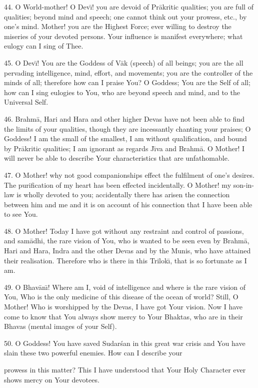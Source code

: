 44. O World-mother! O Dev\={\i}! you are devoid of Pr\=akritic qualities; you are full of qualities; beyond mind and speech; one cannot think out your prowess, etc., by one's mind. Mother! you are the Highest Force; ever willing to destroy the miseries of your devoted persons. Your influence is manifest everywhere; what eulogy can I sing of Thee.

45. O Dev\={\i}! You are the Goddess of V\=ak (speech) of all beings; you are the all pervading intelligence, mind, effort, and movements; you are the controller of the minds of all; therefore how can I praise You? O Goddess; You are the Self of all; how can I sing eulogies to You, who are beyond speech and mind, and to the Universal Self.

46. Brahm\=a, Hari and Hara and other higher Devas have not been able to find the limits of your qualities, though they are incessantly chanting your praises; O Goddess! I am the small of the smallest, I am without qualification, and bound by Pr\=akritic qualities; I am ignorant as regards J\={\i}va and Brahm\=a. O Mother! I will never be able to describe Your characteristics that are unfathomable.

47. O Mother! why not good companionships effect the fulfilment of one's desires. The purification of my heart has been effected incidentally. O Mother! my son-in-law is wholly devoted to you; accidentally there has arisen the connection between him and me and it is on account of his connection that I have been able to see You.

48. O Mother! Today I have got without any restraint and control of passions, and sam\=adhi, the rare vision of You, who is wanted to be seen even by Brahm\=a, Hari and Hara, Indra and the other Devas and by the Munis, who have attained their realisation. Therefore who is there in this Trilok\={\i}, that is so fortunate as I am.

49. O Bhav\=an\={\i}! Where am I, void of intelligence and where is the rare vision of You, Who is the only medicine of this disease of the ocean of world? Still, O Mother! Who is worshipped by the Devas, I have got Your vision. Now I have come to know that You always show mercy to Your Bhaktas, who are in their Bhavas (mental images of your Self).

50. O Goddess! You have saved Sudar\'san in this great war crisis and You have slain these two powerful enemies. How can I describe your

prowess in this matter? This I have understood that Your Holy Character ever shows mercy on Your devotees.

